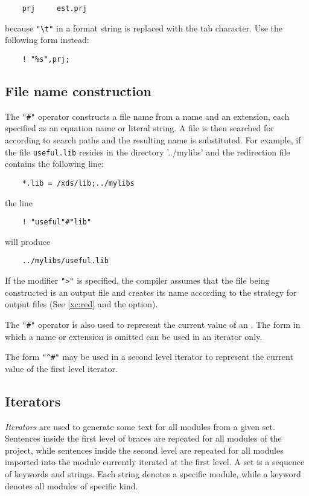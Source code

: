 \verb'    prj     est.prj'

because \verb'"\t"' in a format string is replaced with the tab character.
Use the following form instead:

\verb'    ! "%s",prj;'

\subsection{File name construction}

The \verb|"#"| operator constructs a file name from a name and an
extension, each specified as an equation name or literal string.
A file is then searched for according to \XDS{} search paths
and the resulting name is substituted.
For example, if the file \verb'useful.lib' resides in the directory '../mylibs'
and the redirection file contains the following line:

\verb'    *.lib = /xds/lib;../mylibs'

the line

\verb'    ! "useful"#"lib"'

will produce

\verb'    ../mylibs/useful.lib'

If the modifier \verb|">"| is specified, the compiler assumes that the file
being constructed is an output file and creates its name according to the
strategy for output files (See \ref{xc:red} and the 
option).

The \verb'"#"' operator is also used to represent the current value of
an .
The form in which a name or extension is omitted can be used
in an iterator only.

The form \verb'"^#"' may be used in a second level iterator to represent
the current value of the first level iterator.

\subsection{Iterators}
\label{xc:template:iterators}

{\em Iterators} are used to generate some text for all modules from a given
set. Sentences inside the first level of braces are repeated
for all modules of the project, while sentences inside the second level are
repeated for all modules imported into the module currently iterated at
the first level. A set is a sequence of keywords and strings.
Each string denotes a specific module, while a keyword denotes all
modules of specific kind.

